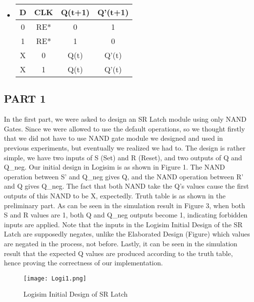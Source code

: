 \documentclass[pdftex,12pt,a4paper]{article}
\begin{document}
\begin{itemize}
  \item 
  
  \begin{center}
 \begin{tabular}{|c|c|c|c|} 
 \hline
 D & CLK & Q(t+1) & Q'(t+1)  \\ 
 \hline\hline
 0 & RE* & 0 & 1\\ 
 \hline
 1 & RE* & 1 & 0\\
 \hline
 X & 0 & Q(t) & Q'(t)\\
 \hline
 X & 1 & Q(t) & Q'(t) \\
 \hline
\end{tabular}
\end{center}

\end{itemize}







\subsection{PART 1}
In the first part, we were asked to design an SR Latch module using only NAND Gates. Since we were allowed to use the default operations, so we thought firstly that we did not have to use NAND gate module we designed and used in previous experiments, but eventually we realized we had to. The design is rather simple, we have two inputs of S (Set) and R (Reset), and two outputs of Q and Q\_neg. Our initial design in Logisim is as shown in Figure 1. The NAND operation between S' and Q\_neg gives Q, and the NAND operation between R' and Q gives Q\_neg. The fact that both NAND take the Q's values cause the first outputs of this NAND to be X, expectedly. Truth table is as shown in the preliminary part. As can be seen in the simulation result in Figure 3, when both S and R values are 1, both Q and Q\_neg outputs become 1, indicating forbidden inputs are applied. Note that the inputs in the Logisim Initial Design of the SR Latch are supposedly negates, unlike the Elaborated Design (Figure) which values are negated in the process, not before. Lastly, it can be seen in the simulation result that the expected Q values are produced according to the truth table, hence proving the correctness of our implementation.


\begin{figure}[ht]
	\centering
	\texttt{[image: Logi1.png]}
	\caption{Logisim Initial Design of SR Latch}
	\label{fig1}
\end{figure}
\end{document}

